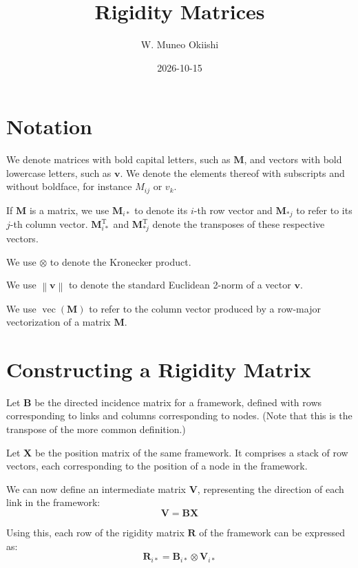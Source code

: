 \documentclass[11pt]{article}
\title{Rigidity Matrices}
\author{W. Muneo Okiishi}
\date{2026-10-15}
\DeclareMathOperator\vectorize{vec}
\begin{document}
\maketitle

\section{Notation}

We denote matrices with bold capital letters, such as $\mathbf{M}$, and
vectors with bold lowercase letters, such as $\mathbf{v}$. We denote the
elements thereof with subscripts and without boldface, for instance $M_{ij}$
or $v_k$.

If $\mathbf{M}$ is a matrix, we use $\mathbf{M}_{i*}$ to denote its $i$-th row
vector and $\mathbf{M}_{*j}$ to refer to its $j$-th column vector.
$\mathbf{M}_{i*}^\mathrm{T}$ and $\mathbf{M}_{*j}^\mathrm{T}$ denote the
transposes of these respective vectors.

We use $\otimes$ to denote the Kronecker product.

We use $\left \lVert \mathbf{v} \right \rVert$ to denote the standard Euclidean
2-norm of a vector $\mathbf{v}$.

We use $\vectorize(\mathbf{M})$ to refer to the column vector produced by a
row-major vectorization of a matrix $\mathbf{M}$.

\section{Constructing a Rigidity Matrix}

Let $\mathbf{B}$ be the directed incidence matrix for a framework,
defined with rows corresponding to links and columns corresponding to nodes.
(Note that this is the transpose of the more common definition.)

Let $\mathbf{X}$ be the position matrix of the same framework.
It comprises a stack of row vectors, each corresponding to the position of a
node in the framework.

We can now define an intermediate matrix $\mathbf{V}$, representing the
direction of each link in the framework:
\begin{equation} \label{eq:V_def}
    \mathbf{V} = \mathbf{B} \mathbf{X}
\end{equation}

Using this, each row of the rigidity matrix $\mathbf{R}$ of the framework can
be expressed as:
\begin{equation} \label{eq:R_def}
    \mathbf{R}_{i*} = \mathbf{B}_{i*} \otimes \mathbf{V}_{i*}
\end{equation}
\end{document}
